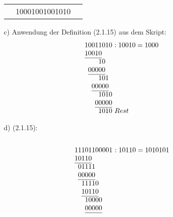 \documentclass{article}
\begin{document}
\begin{itemize}
\begin{center}
\begin{tabular}{crl}
        	  &        10001001001010 &
        \end{tabular}
        \end{center}
        \item[c)] Anwendung der Definition (2.1.15) aus dem Skript:\\
        \[\setlength{\arraycolsep}{0pt}
        \begin{array}{*{9}{l}}
        	1 & 0 & 0 & 1 & 1 & 0 & 1 & 0 & \ :10010=1000   \\
        	1 & 0 & 0 & 1 & 0 &   &   &   &                 \\ \cline{1-5}
        	  &   &   &   & 1 & 0 &   &   &                 \\
        	  & 0 & 0 & 0 & 0 & 0 &   &   &                 \\ \cline{2-6}
        	  &   &   &   & 1 & 0 & 1 &   &                 \\
        	  &   & 0 & 0 & 0 & 0 & 0 &   &                 \\ \cline{3-7}
        	  &   &   &   & 1 & 0 & 1 & 0 &                 \\
        	  &   &   & 0 & 0 & 0 & 0 & 0 &                 \\ \cline{4-8}
        	  &   &   &   & 1 & 0 & 1 & 0 & \ Rest        
        \end{array}
        \]
        \newpage
        \item[d)] (2.1.15):\\\\
        \[\setlength{\arraycolsep}{0pt}
       \begin{array}{*{14}{l}}
       	1 & 1 & 1 & 0 & 1 & 1 & 0 & 0 & 0 & 0 & 1 & \ :10110=1010101 \\
       	1 & 0 & 1 & 1 & 0 &   &   &   &   &   &   &                  \\ \cline{1-5}
       	  & 0 & 1 & 1 & 1 & 1 &   &   &   &   &   &                  \\
       	  & 0 & 0 & 0 & 0 & 0 &   &   &   &   &   &                  \\ \cline{2-6}
       	  &   & 1 & 1 & 1 & 1 & 0 &   &   &   &   &                  \\
       	  &   & 1 & 0 & 1 & 1 & 0 &   &   &   &   &                  \\ \cline{3-7}
       	  &   &   & 1 & 0 & 0 & 0 & 0 &   &   &   &                  \\
       	  &   &   & 0 & 0 & 0 & 0 & 0 &   &   &   &                  \\ \cline{4-8}

\end{array}\]
\end{itemize}
\end{document}
